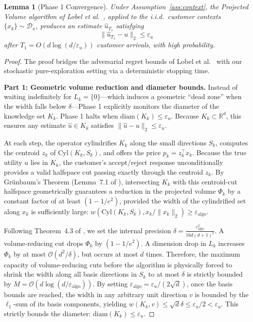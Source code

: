 \documentclass[letterpaper, 10 pt, conference]{IEEEconf}
\newtheorem{lemma}{Lemma}
\newcommand{\what}[1]{\widehat{#1}}
\begin{document}
\begin{lemma}[Phase 1 Convergence]
    \label{lem:phase1}
    Under Assumption~\ref{ass:context}, the Projected Volume algorithm of Lobel et al.~\cite{Lobel2018multidimensional}, applied to the i.i.d.\ customer contexts $\{x_k\} \sim \mathcal{D}_x$, produces an estimate $\what{u}_{T_1}$ satisfying
    \begin{equation}
        \|\what{u}_{T_1} - u\|_2 \leq \varepsilon_u
    \end{equation}
    after $T_1 = O(d \log(d / \varepsilon_u))$ customer arrivals, with high probability.
\end{lemma}

\begin{proof}
    The proof bridges the adversarial regret bounds of Lobel et al.~\cite{Lobel2018multidimensional} with our stochastic pure-exploration setting via a deterministic stopping time.

    \textbf{Part 1: Geometric volume reduction and diameter bounds.}
    Instead of waiting indefinitely for $L_k = \{0\}$---which induces a geometric ``dead zone'' when the width falls below $\delta$---Phase 1 explicitly monitors the diameter of the knowledge set $K_k$. Phase 1 halts when $\mathrm{diam}(K_k) \le \varepsilon_u$. Because $K_k \subset \mathbb{R}^d$, this ensures any estimate $\what{u} \in K_k$ satisfies $\|\what{u} - u\|_2 \le \varepsilon_u$.

    At each step, the operator cylindrifies $K_k$ along the small directions $S_k$, computes the centroid $z_k$ of $\mathrm{Cyl}(K_k, S_k)$, and offers the price $p_k = z_k^\top x_k$. Because the true utility $u$ lies in $K_k$, the customer's accept/reject response unconditionally provides a valid halfspace cut passing exactly through the centroid $z_k$. By Gr\"unbaum's Theorem (Lemma~7.1 of \cite{Lobel2018multidimensional}), intersecting $K_k$ with this centroid-cut halfspace geometrically guarantees a reduction in the projected volume $\Phi_k$ by a constant factor of at least $(1 - 1/e^2)$, provided the width of the cylindrified set along $x_k$ is sufficiently large: $w(\mathrm{Cyl}(K_k, S_k), x_k / \|x_k\|_2) \geq \varepsilon_{\mathrm{algo}}$.

    Following Theorem~4.3 of \cite{Lobel2018multidimensional}, we set the internal precision $\delta = \frac{\varepsilon_{\mathrm{algo}}^2}{16d(d+1)^2}$. A volume-reducing cut drops $\Phi_k$ by $(1 - 1/e^2)$. A dimension drop in $L_k$ increases $\Phi_k$ by at most $\mathcal{O}(d^2/\delta)$, but occurs at most $d$ times. Therefore, the maximum capacity of volume-reducing cuts before the algorithm is physically forced to shrink the width along all basis directions in $S_k$ to at most $\delta$ is strictly bounded by $M = \mathcal{O}(d \log(d/\varepsilon_{\mathrm{algo}}))$. By setting $\varepsilon_{\mathrm{algo}} = \varepsilon_u / (2\sqrt{d})$, once the basis bounds are reached, the width in any arbitrary unit direction $v$ is bounded by the $\ell_1$-sum of its basis components, yielding $w(K_k, v) \leq \sqrt{d}\delta \le \varepsilon_u/2 < \varepsilon_u$. This strictly bounds the diameter: $\mathrm{diam}(K_k) \leq \varepsilon_u$.


\end{proof}
\end{document}
